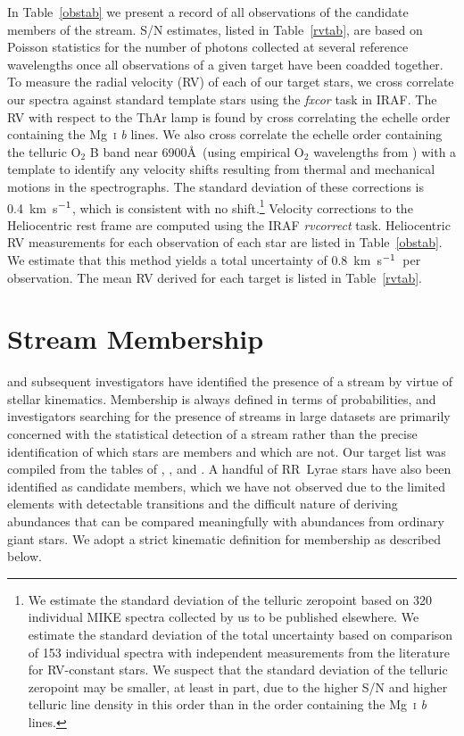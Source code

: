 \documentclass{emulateapj}
\def\kmsec{\mbox{km~s$^{\rm -1}$}}
\begin{document}
In Table~\ref{obstab} we present a record of all observations of 
the candidate members of the stream.
S/N estimates, listed in Table~\ref{rvtab}, are based on
Poisson statistics for the number of photons collected 
at several reference wavelengths
once all observations of a given target have been coadded together.
To measure the radial velocity (RV) of each of our target stars,
we cross correlate our spectra against standard template stars
using the \textit{fxcor} task in IRAF.
The RV with respect to the ThAr lamp
is found by cross correlating the echelle
order containing the Mg~\textsc{i} \textit{b} lines.
We also cross correlate the echelle
order containing the telluric O$_{2}$ B band near 6900\AA\ 
(using empirical O$_{2}$ wavelengths from \citealt{griffin73})
with a template to identify any velocity shifts resulting from 
thermal and mechanical motions in the spectrographs.
The standard deviation of these corrections is 0.4~\kmsec,
which is consistent with no shift.\footnote{
We estimate the standard deviation of the telluric zeropoint 
based on 320 individual MIKE spectra
collected by us to be published elsewhere.
We estimate the standard deviation of the total uncertainty 
based on comparison of 153 individual spectra with
independent measurements from the literature for 
RV-constant stars.
We suspect that the standard deviation of the telluric zeropoint
may be smaller, at least in part, 
due to the higher S/N and higher telluric line density
in this order than in the order containing the 
Mg~\textsc{i} \textit{b} lines.}
Velocity corrections to the Heliocentric rest frame are computed 
using the IRAF \textit{rvcorrect} task.
Heliocentric RV measurements for each observation of each star are
listed in Table~\ref{obstab}.
We estimate that this method yields a total uncertainty of 0.8~\kmsec\ 
per observation.
The mean RV derived for each target is listed in Table~\ref{rvtab}.


\section{Stream Membership}
\label{membership}


\citet{helmi99b} and subsequent investigators have identified
the presence of a stream by virtue of stellar kinematics.
Membership is always defined in terms of probabilities, and
investigators searching for the presence of streams in large
datasets are primarily concerned with the statistical detection
of a stream rather than the precise identification of which
stars are members and which are not.
Our target list was compiled from the
tables of \citet{chiba00}, \citet{refiorentin05}, and 
\citet{kepley07}.
A handful of RR~Lyrae stars have also been identified as candidate
members, which we have not observed due to the limited elements 
with detectable transitions and the difficult nature
of deriving abundances that can be compared meaningfully with abundances
from ordinary giant stars.
We adopt a strict kinematic
definition for membership as described below.
\end{document}
